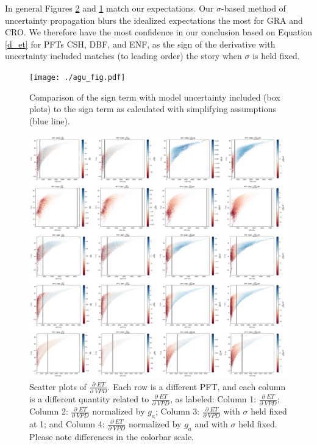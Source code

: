 \documentclass[draft,linenumbers]{agujournal}
\begin{document}
In general Figures \ref{real} and \ref{agu_fig} match our expectations. Our $\sigma$-based method of uncertainty propagation blurs the idealized expectations the most for GRA and CRO. We therefore have the most confidence in our conclusion based on Equation \ref{d_et} for PFTs CSH, DBF, and ENF, as the sign of the derivative with uncertainty included matches (to leading order) the story when $\sigma$ is held fixed.

\begin{figure}[h]
\centering
\texttt{[image: ./agu\_fig.pdf]}
\caption{Comparison of the sign term with model uncertainty included (box plots) to the sign term as calculated with simplifying assumptions (blue line).}
\label{agu_fig}
\end{figure}


\begin{figure}[h]
\centering
\centerline{\includegraphics[width=1.4\textwidth]{./fig06.png}}
\caption{Scatter plots of $\frac{\partial \; ET}{\partial \; VPD}$. Each row is a different PFT, and each column is a different quantity related to $\frac{\partial \; ET}{\partial \; VPD}$, as labeled: Column 1: $\frac{\partial \; ET}{\partial \; VPD}$; Column 2: $\frac{\partial \; ET}{\partial \; VPD}$ normalized by $g_a$; Column 3: $\frac{\partial \; ET}{\partial \; VPD}$ with $\sigma$ held fixed at 1; and Column 4: $\frac{\partial \; ET}{\partial \; VPD}$ normalized by $g_a$ and with $\sigma$ held fixed. Please note differences in the colorbar scale.}
\label{real}
\end{figure}
\end{document}
